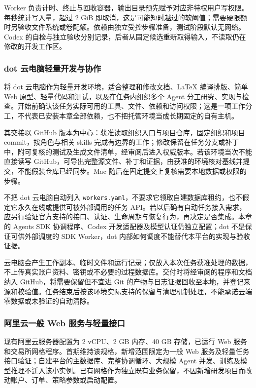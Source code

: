 \documentclass[11pt,a4paper]{article}
\begin{document}
Worker 负责计时、终止与回收容器，输出目录预先赋予对应非特权用户写权限。每秒统计写入量，超过 2 GiB 即取消，这是可能短时越过的软阈值；需要硬限额时另验收文件系统或卷配额。依赖由独立受控步骤准备，测试阶段默认无网络。Codex 的自检与独立验收分别记录，后者从固定候选重新取得输入，不读取仍在修改的开发工作区。

\subsubsection{dot 云电脑轻量开发与协作}

将 dot 云电脑作为轻量开发环境，适合整理和修改文档、LaTeX 编译排版、简单 Web 原型、轻量代码和测试，以及在任务内组织多个 Agent 分工研究、实现与检查。开始前确认该任务实际可用的工具、文件、依赖和访问权限；这是一项工作分工，不代表已安装本章全部依赖，也不把托管环境当成长期固定的自有主机。

其交接以 GitHub 版本为中心：获准读取组织入口与项目仓库，固定组织和项目 commit，按角色与相关 skills 完成有边界的工作；修改保留在任务分支或补丁中，附可复核的测试及生成文件清单，经审阅后进入权威版本。若该环境当次不能直接读写 GitHub，可导出完整源文件、补丁和证据，由获准的环境核对基线并提交，不能假装仓库已经同步。Mac 随后在固定提交上复核需要本地数据或权限的步骤。

不把 dot 云电脑自动列入 \texttt{workers.yaml}，不要求它领取自建数据库租约，也不假定它永久在线或提供可被外部调用的任务 API。若以后确有自动任务接入需求，应另行验证官方支持的接口、认证、生命周期与恢复行为，再决定是否集成。本章的 Agents SDK 协调程序、Codex 开发适配器及模型认证仍独立配置；dot 不是保证可供外部调度的 SDK Worker，dot 内部如何调度不能替代本平台的实现与验收证据。

云电脑会产生工作副本、临时文件和运行记录；仅放入本次任务获准处理的数据，不上传真实账户资料、密钥或不必要的过程数据库。交付时将经审阅的程序和文档纳入 GitHub，将需要保留但不宜进 Git 的产物与日志证据回收至本地，并登记来源和校验值。任务结束后按该环境实际支持的保留与清理机制处理，不能承诺云端零数据或未验证的自动清除。

\subsubsection{阿里云一般 Web 服务与轻量接口}

现有阿里云服务器配置为 2 vCPU、2 GB 内存、40 GB 存储，已运行 Web 服务和交易所网格程序。首期维持该规格，新增范围限定为一般 Web 服务及轻量任务接口验证；自建平台的主数据库、完整协调循环、大规模 Agent 并发、训练及模型推理不迁入该小实例。已有网格作为独立既有业务保留，不因新增研发项目而改动账户、订单、策略参数或启动配置。
\end{document}
